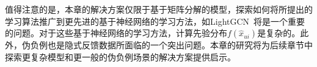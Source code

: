 值得注意的是，本章的解决方案仅限于基于矩阵分解的模型，探索如何将所提出的学习算法推广到更先进的基于神经网络的学习方法，如LightGCN~\cite{Xiangnan:2020:SIGIR}将是一个重要的问题。对于这些基于神经网络的学习方法，计算先验分布$f(\hat{x}_{ui})$是复杂的。此外，伪负例也是隐式反馈数据所面临的一个突出问题。本章的研究将为后续章节中探索更复杂模型和更一般的伪负例场景的解决方案提供启示。